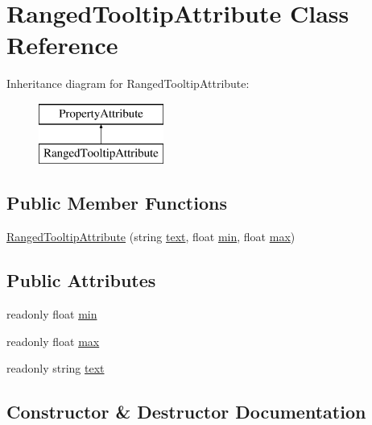 \hypertarget{class_ranged_tooltip_attribute}{}\section{Ranged\+Tooltip\+Attribute Class Reference}
\label{class_ranged_tooltip_attribute}
Inheritance diagram for Ranged\+Tooltip\+Attribute\+:\begin{figure}[H]
\begin{center}
\leavevmode
\includegraphics[height=2.000000cm]{class_ranged_tooltip_attribute}
\end{center}
\end{figure}
\subsection*{Public Member Functions}
\begin{DoxyCompactItemize}
\item 
\hyperlink{class_ranged_tooltip_attribute_ad849bcb84d94a4710bfc4c8e25c63632}{Ranged\+Tooltip\+Attribute} (string \hyperlink{class_ranged_tooltip_attribute_ad2f35b60b52111367a6cefd7b1880e23}{text}, float \hyperlink{class_ranged_tooltip_attribute_adf16fa96f424997cf2601d666b3b3e10}{min}, float \hyperlink{class_ranged_tooltip_attribute_aa5a6b9d8e8612b929476adc6f63b80f4}{max})
\end{DoxyCompactItemize}
\subsection*{Public Attributes}
\begin{DoxyCompactItemize}
\item 
readonly float \hyperlink{class_ranged_tooltip_attribute_adf16fa96f424997cf2601d666b3b3e10}{min}
\item 
readonly float \hyperlink{class_ranged_tooltip_attribute_aa5a6b9d8e8612b929476adc6f63b80f4}{max}
\item 
readonly string \hyperlink{class_ranged_tooltip_attribute_ad2f35b60b52111367a6cefd7b1880e23}{text}
\end{DoxyCompactItemize}


\subsection{Constructor \& Destructor Documentation}
\mbox{\label{class_ranged_tooltip_attribute_ad849bcb84d94a4710bfc4c8e25c63632}} 
